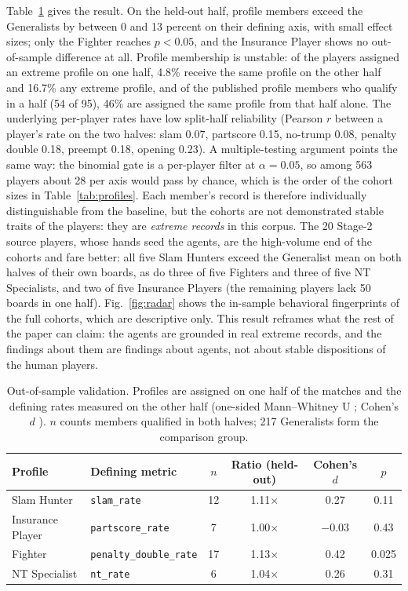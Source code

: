 \documentclass[11pt,a4paper]{article}
\begin{document}
Table~\ref{tab:cohend} gives the result. On the held-out half, profile
members exceed the Generalists by between 0 and 13 percent on their
defining axis, with small effect sizes; only the Fighter reaches
$p<0.05$, and the Insurance Player shows no out-of-sample difference at
all. Profile membership is unstable: of the players assigned an extreme
profile on one half, 4.8\% receive the same profile on the other half
and 16.7\% any extreme profile, and of the published profile members
who qualify in a half (54 of 95), 46\% are assigned the same profile
from that half alone. The underlying per-player
rates have low split-half reliability (Pearson $r$ between a player's
rate on the two halves: slam 0.07, partscore 0.15, no-trump 0.08,
penalty double 0.18, preempt 0.18, opening 0.23). A multiple-testing
argument points the same way: the binomial gate is a per-player filter
at $\alpha=0.05$, so among 563 players about 28 per axis would pass by
chance, which is the order of the cohort sizes in
Table~\ref{tab:profiles}. Each member's record is therefore
individually distinguishable from the baseline, but the cohorts are not
demonstrated stable traits of the players: they are \emph{extreme
records} in this corpus. The 20 Stage-2 source players, whose hands
seed the agents, are the high-volume end of the cohorts and fare
better: all five Slam Hunters exceed the Generalist mean on both halves
of their own boards, as do three of five Fighters and three of five NT
Specialists, and two of five Insurance Players (the remaining players
lack 50 boards in one half). Fig.~\ref{fig:radar} shows the in-sample
behavioral fingerprints of the full cohorts, which are descriptive
only. This result reframes what the rest of the paper can claim: the
agents are grounded in real extreme records, and the findings about
them are findings about agents, not about stable dispositions of the
human players.

\begin{table}[h]
\centering\small
\caption{Out-of-sample validation. Profiles are assigned on one half of
the matches and the defining rates measured on the other half
(one-sided Mann--Whitney U \cite{mann1947test}; Cohen's $d$
\cite{cohen1988statistical}). $n$ counts members qualified in both
halves; 217 Generalists form the comparison group.}
\label{tab:cohend}
\begin{tabular}{llcccc}
\toprule
Profile & Defining metric & $n$ & Ratio (held-out) & Cohen's $d$ & $p$\\
\midrule
Slam Hunter      & \texttt{slam\_rate}            & 12 & 1.11$\times$ & 0.27 & 0.11\\
Insurance Player & \texttt{partscore\_rate}       &  7 & 1.00$\times$ & $-0.03$ & 0.43\\
Fighter          & \texttt{penalty\_double\_rate} & 17 & 1.13$\times$ & 0.42 & 0.025\\
NT Specialist    & \texttt{nt\_rate}              &  6 & 1.04$\times$ & 0.26 & 0.31\\
\bottomrule
\end{tabular}
\end{table}
\end{document}
